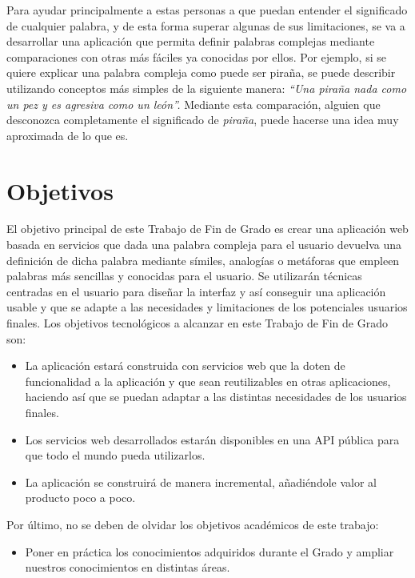 Para ayudar principalmente a estas personas a que puedan entender el significado de cualquier palabra, y de esta forma superar algunas de sus limitaciones, se va a desarrollar una aplicación que permita definir palabras complejas mediante comparaciones con otras más fáciles ya conocidas por ellos. Por ejemplo, si se quiere explicar una palabra compleja como puede ser piraña, se puede describir utilizando conceptos más simples de la siguiente manera:\textit{ ``Una piraña nada como un pez y es agresiva como un león''.} Mediante esta comparación, alguien que desconozca completamente el significado de \textit{piraña}, puede hacerse una idea muy aproximada de lo que es.


\section{Objetivos}
\label{cap:sec:objetivos}

El objetivo principal de este Trabajo de Fin de Grado es crear una aplicación web basada en servicios que dada una palabra compleja para el usuario devuelva una definición  de dicha palabra mediante símiles, analogías o metáforas que empleen palabras más sencillas y conocidas para el usuario. 
Se utilizarán técnicas centradas en el usuario para diseñar la interfaz y así conseguir una aplicación usable y que se adapte a las necesidades y limitaciones de los potenciales usuarios finales.
Los objetivos tecnológicos a alcanzar en este Trabajo de Fin de Grado son:
\begin{itemize}
	\item La aplicación estará construida con servicios web que la doten de funcionalidad a la aplicación y que sean reutilizables en otras aplicaciones, haciendo así que se puedan adaptar a las distintas necesidades de los usuarios finales.
	\item Los servicios web desarrollados estarán disponibles en una API pública para que todo el mundo pueda utilizarlos.	
	\item La aplicación se construirá de manera incremental, añadiéndole valor al producto poco a poco.	
	
\end{itemize}

Por último, no se deben de olvidar los objetivos académicos de este trabajo:
\begin{itemize}
	\item Poner en práctica los conocimientos adquiridos durante el Grado y ampliar nuestros conocimientos en distintas áreas.

	
\end{itemize}

